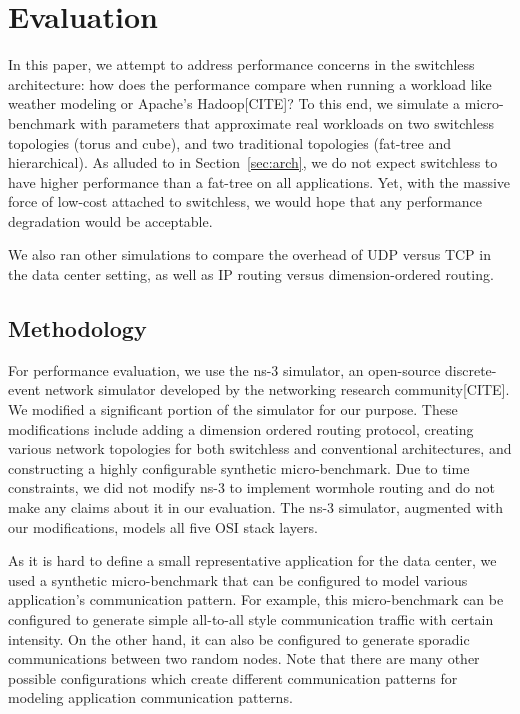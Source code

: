 \section{Evaluation}
\label{sec:eval}
In this paper, we attempt to address performance concerns in the switchless architecture: how does the performance compare when running a workload like weather modeling or Apache's Hadoop[CITE]? To this end, we simulate a micro-benchmark with parameters that approximate real workloads on two switchless topologies (torus and cube), and two traditional topologies (fat-tree and hierarchical). As alluded to in Section~\ref{sec:arch}, we do not expect switchless to have higher performance than a fat-tree on all applications. Yet, with the massive force of low-cost attached to switchless, we would hope that any performance degradation would be acceptable.

We also ran other simulations to compare the overhead of UDP versus TCP in the data center setting, as well as IP routing versus dimension-ordered routing.

\subsection {Methodology}
For performance evaluation, we use the ns-3 simulator\cite{Ns3:Online}, an open-source discrete-event network simulator developed by the networking research community[CITE]. We modified a significant portion of the simulator for our purpose. These modifications include adding a dimension ordered routing protocol, creating various network topologies for both switchless and conventional architectures, and constructing a highly configurable synthetic micro-benchmark.  Due to time constraints, we did not modify ns-3 to implement wormhole routing and do not make any claims about it in our evaluation.  The ns-3 simulator, augmented with our modifications, models all five OSI stack layers.

As it is hard to define a small representative application for the data center, we used a synthetic micro-benchmark that can be configured to model various application's communication pattern. For example, this micro-benchmark can be configured to generate simple all-to-all style communication traffic with certain intensity. On the other hand, it can also be configured to generate sporadic communications between two random nodes. Note that there are many other possible configurations which create different communication patterns for modeling application communication patterns.

